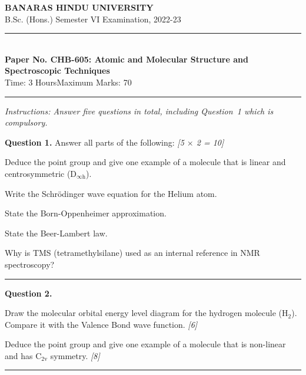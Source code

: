 \documentclass[11pt,a4paper]{article}
\newcommand{\pts}[1]{\hfill   \textit{[#1]}}
\begin{document}
\begin{center}
  {\large\bfseries BANARAS HINDU UNIVERSITY}\\[2pt]
  {\normalsize B.Sc. (Hons.) Semester VI Examination, 2022-23}\\[6pt]
  \rule{0.8\linewidth}{0.5pt}\\[6pt]
  {\large\bfseries Paper No. CHB-605: Atomic and Molecular Structure and Spectroscopic Techniques}\\[4pt]
  {\normalsize Time: 3 Hours\hfill Maximum Marks: 70}
\end{center}
\rule{\linewidth}{0.4pt}
\small



\noindent   \textit{Instructions: Answer five questions in total, including Question~1 which is compulsory.}

\normalsize
\bigskip




\noindent   \textbf{Question 1.} Answer all parts of the following: \pts{5 $ \times$ 2 = 10}

\begin{parts}
  \item Deduce the point group and give one example of a molecule that is linear and centrosymmetric ($ \text{D}_{\infty \text{h}}$).
  \item Write the Schr\"odinger wave equation for the Helium atom.
  \item State the Born-Oppenheimer approximation.
  \item State the Beer-Lambert law.
  \item Why is TMS (tetramethylsilane) used as an internal reference in NMR spectroscopy?
\end{parts}

\medskip\rule{\linewidth}{0.2pt}




\noindent   \textbf{Question 2.}

\begin{parts}
  \item Draw the molecular orbital energy level diagram for the hydrogen molecule ($ \text{H}_2$). Compare it with the Valence Bond wave function. \pts{6}
  \item Deduce the point group and give one example of a molecule that is non-linear and has $ \text{C}_{2 \text{v}}$ symmetry. \pts{8}
\end{parts}

\medskip\rule{\linewidth}{0.2pt}
\end{document}
